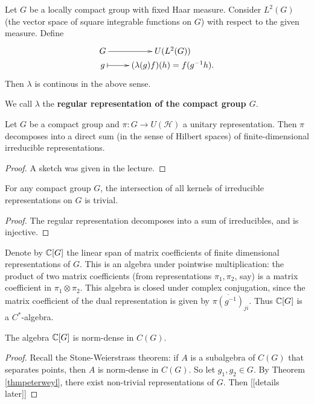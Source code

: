 \documentclass[11pt, english]{article}
\begin{document}
\begin{example}
 Let $G$ be a locally compact group with fixed Haar measure. Consider $L^2(G)$ (the vector space of square integrable functions on $G$) with respect to the given measure. Define
$$
\xymatrix @ R = 0mm{
G \ar[r] &U(L^2(G)) \\
g \ar@{|->}[r] & (\lambda(g)f)(h) = f(g^{-1}h).
}
$$
Then $\lambda$ is continous in the above sense.

We call $\lambda$ the \textbf{regular representation of the compact group $G$}.
\end{example}

\begin{thm}
\label{thmpeterweyl}
Let $G$ be a compact group and $\pi:G \to U(\mathcal H)$ a unitary representation. Then $\pi$ decomposes into a direct sum (in the sense of Hilbert spaces) of finite-dimensional irreducible representations.
  
\end{thm}

\begin{proof}
A sketch was given in the lecture.
\end{proof}

\begin{corr}
For any compact group $G$, the intersection of all kernels of irreducible representations on $G$ is trivial.
\end{corr}
\begin{proof}
The regular representation decomposes into a sum of irreducibles, and is injective. 
\end{proof}

Denote by $\mathbb{C}[G]$ the linear span of matrix coefficients of finite dimensional representations of $G$. This is an algebra under pointwise multiplication: the product of two matrix coefficients (from representations $\pi_1,\pi_2$, say) is a matrix coefficient in $\pi_1 \otimes \pi_2$. This algebra is closed under complex conjugation, since the matrix coefficient of the dual representation is given by $\overline{\pi(g^{-1})}_{ji}$. Thus $\mathbb{C}[G]$ is a $C^\ast$-algebra.

\begin{corr}
  The algebra $\mathbb{C}[G]$ is norm-dense in $C(G)$.
\end{corr}
\begin{proof}
Recall the Stone-Weierstrass theorem: if $A$ is a subalgebra of $C(G)$ that separates points, then $A$ is norm-dense in $C(G)$. So let $g_1,g_2 \in G$. By Theorem \ref{thmpeterweyl}, there exist non-trivial representations of $G$. Then [[details later]]
\end{proof}
\end{document}
